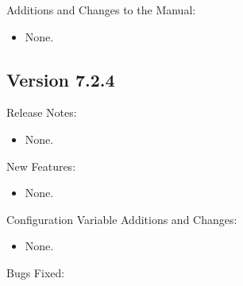 \noindent Additions and Changes to the Manual:

\begin{itemize}

\item None.

\end{itemize}


\subsection*{\label{sec:New-7-2-4}Version 7.2.4}

\noindent Release Notes:

\begin{itemize}

\item None.

\end{itemize}


\noindent New Features:

\begin{itemize}

\item None.

\end{itemize}

\noindent Configuration Variable Additions and Changes:

\begin{itemize}

\item None.

\end{itemize}

\noindent Bugs Fixed:

